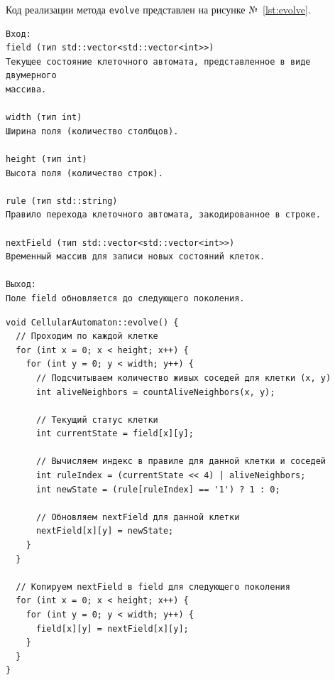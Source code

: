 \documentclass[a4paper, final]{article}
\begin{document}
Код реализации метода \texttt{evolve} представлен на рисунке №~\ref{lst:evolve}.

\begin{verbatim}
Вход:
field (тип std::vector<std::vector<int>>)
Текущее состояние клеточного автомата, представленное в виде двумерного 
массива.

width (тип int)
Ширина поля (количество столбцов).

height (тип int)
Высота поля (количество строк).

rule (тип std::string)
Правило перехода клеточного автомата, закодированное в строке.

nextField (тип std::vector<std::vector<int>>)
Временный массив для записи новых состояний клеток.

Выход:
Поле field обновляется до следующего поколения.
\end{verbatim}

\begin{lstlisting}[caption={Код реализации метода \texttt{evolve}}, label={lst:evolve}]
void CellularAutomaton::evolve() {
  // Проходим по каждой клетке
  for (int x = 0; x < height; x++) {
    for (int y = 0; y < width; y++) {
      // Подсчитываем количество живых соседей для клетки (x, y)
      int aliveNeighbors = countAliveNeighbors(x, y);

      // Текущий статус клетки
      int currentState = field[x][y];

      // Вычисляем индекс в правиле для данной клетки и соседей
      int ruleIndex = (currentState << 4) | aliveNeighbors;
      int newState = (rule[ruleIndex] == '1') ? 1 : 0;

      // Обновляем nextField для данной клетки
      nextField[x][y] = newState;
    }
  }

  // Копируем nextField в field для следующего поколения
  for (int x = 0; x < height; x++) {
    for (int y = 0; y < width; y++) {
      field[x][y] = nextField[x][y];
    }
  }
}
\end{lstlisting}
  

\newpage
\end{document}
